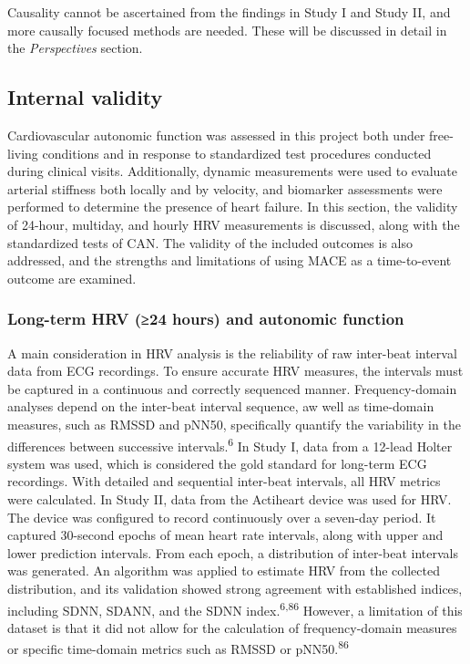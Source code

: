 \documentclass[
  letterpaper,
  headsepline=true,
  open=any]{scrbook}
\begin{document}
Causality cannot be ascertained from the findings in Study I and Study
II, and more causally focused methods are needed. These will be
discussed in detail in the \emph{Perspectives} section.

\hypertarget{internal-validity}{%
\subsection{Internal validity}\label{internal-validity}}

Cardiovascular autonomic function was assessed in this project both
under free-living conditions and in response to standardized test
procedures conducted during clinical visits. Additionally, dynamic
measurements were used to evaluate arterial stiffness both locally and
by velocity, and biomarker assessments were performed to determine the
presence of heart failure. In this section, the validity of 24-hour,
multiday, and hourly HRV measurements is discussed, along with the
standardized tests of CAN. The validity of the included outcomes is also
addressed, and the strengths and limitations of using MACE as a
time-to-event outcome are examined.

\hypertarget{long-term-hrv-24-hours-and-autonomic-function}{%
\subsubsection{Long-term HRV (≥24 hours) and autonomic
function}\label{long-term-hrv-24-hours-and-autonomic-function}}

A main consideration in HRV analysis is the reliability of raw
inter-beat interval data from ECG recordings. To ensure accurate HRV
measures, the intervals must be captured in a continuous and correctly
sequenced manner. Frequency-domain analyses depend on the inter-beat
interval sequence, aw well as time-domain measures, such as RMSSD and
pNN50, specifically quantify the variability in the differences between
successive intervals.\textsuperscript{6} In Study I, data from a 12-lead
Holter system was used, which is considered the gold standard for
long-term ECG recordings. With detailed and sequential inter-beat
intervals, all HRV metrics were calculated. In Study II, data from the
Actiheart device was used for HRV. The device was configured to record
continuously over a seven-day period. It captured 30-second epochs of
mean heart rate intervals, along with upper and lower prediction
intervals. From each epoch, a distribution of inter-beat intervals was
generated. An algorithm was applied to estimate HRV from the collected
distribution, and its validation showed strong agreement with
established indices, including SDNN, SDANN, and the SDNN
index.\textsuperscript{6,86} However, a limitation of this dataset is
that it did not allow for the calculation of frequency-domain measures
or specific time-domain metrics such as RMSSD or
pNN50.\textsuperscript{86}
\end{document}
